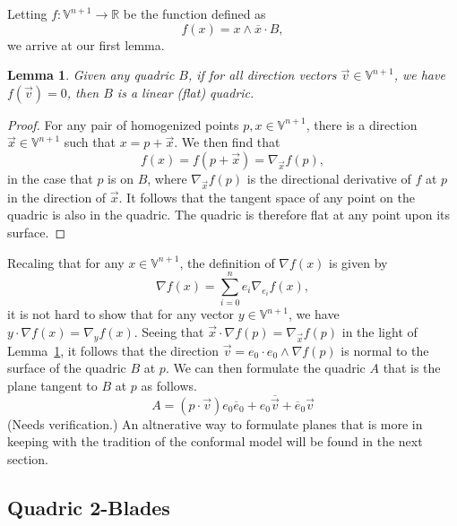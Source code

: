 \documentclass{ecgd-l}
\newtheorem{lemma}[theorem]{Lemma}
\theoremstyle{definition}
\theoremstyle{remark}
\numberwithin{equation}{section}
\newcommand{\V}{\mathbb{V}}
\newcommand{\R}{\mathbb{R}}
\begin{document}
Letting $f:\V^{n+1}\to\R$ be the function defined as
\begin{equation}
f(x) = x\wedge\overline{x}\cdot B,
\end{equation}
we arrive at our first lemma.
\begin{lemma}\label{lma_flat_quadric}
Given any quadric $B$, if for all direction vectors $\vec{v}\in\V^{n+1}$,
we have $f(\vec{v})=0$, then $B$ is a linear (flat) quadric.
\end{lemma}
\begin{proof}
For any pair of homogenized points $p,x\in\V^{n+1}$, there is a direction $\vec{x}\in\V^{n+1}$
such that $x=p+\vec{x}$.  We then find that
\begin{equation}
f(x) = f(p+\vec{x}) = \nabla_{\vec{x}}f(p),
\end{equation}
in the case that $p$ is on $B$, where $\nabla_{\vec{x}}f(p)$ is the directional
derivative of $f$ at $p$ in the direction of $\vec{x}$.  It follows that the tangent
space of any point on the quadric is also in the quadric.  The quadric is therefore
flat at any point upon its surface.
\end{proof}
Recaling that for any $x\in\V^{n+1}$, the definition of $\nabla f(x)$ is given by
\begin{equation}
\nabla f(x) = \sum_{i=0}^n e_i\nabla_{e_i}f(x),
\end{equation}
it is not hard to show that for any vector $y\in\V^{n+1}$, we have
$y\cdot\nabla f(x)=\nabla_y f(x)$.  Seeing that $\vec{x}\cdot\nabla f(p)=\nabla_{\vec{x}}f(p)$
in the light of Lemma~\ref{lma_flat_quadric},
it follows that the direction $\vec{v}=e_0\cdot e_0\wedge\nabla f(p)$
is normal to the surface of the quadric $B$ at $p$.  We can then formulate
the quadric $A$ that is the plane tangent to $B$ at $p$ as follows.
\begin{equation}
A = (p\cdot\vec{v})e_0\overline{e}_0 + e_0\overline{\vec{v}}+\overline{e}_0\vec{v}
\end{equation}
(Needs verification.)
An altnerative way to formulate planes that is more in keeping with the
tradition of the conformal model will be found in the next section.

\subsection{Quadric 2-Blades}
\end{document}
